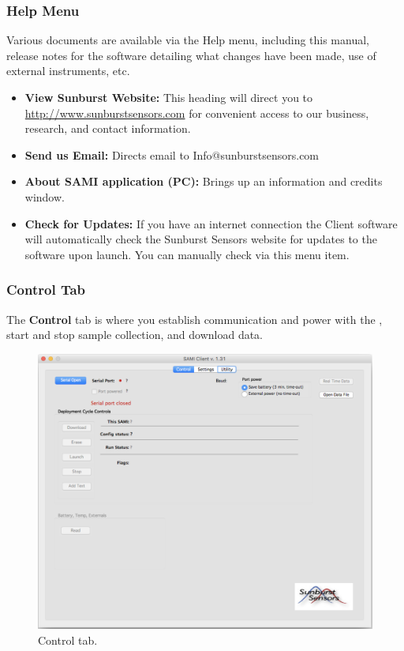 \subsubsection{Help Menu}

Various documents are available via the Help menu, including this manual, release notes for the software detailing what changes have been made, use of external instruments, etc.

\begin{itemize}
    \item[] \textbf{View Sunburst Website:}
    This heading will direct you to \url{http://www.sunburstsensors.com} for convenient access to our business, research, and contact information. 
    
    \item[] \textbf{Send us Email:}
    Directs email to Info@sunburstsensors.com
    
    \item[] \textbf{About SAMI application (PC):}
    Brings up an information and credits window.
    
    \item[] \textbf{Check for Updates:}
    If you have an internet connection the \instType{} Client software will automatically check the Sunburst Sensors website for updates to the software upon launch. You can manually check via this menu item.
\end{itemize}


\subsubsection{Control Tab}

The \textbf{Control} tab is where you establish communication and power with the \instType{}, start and stop sample collection, and download data.

\begin{figure}[ht]
\centering
\includegraphics[width=1.0\textwidth]{figs/Cntl_Tab.png}
\caption{Control tab.}
\label{fig:CntlTab}
\end{figure}


